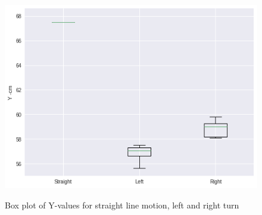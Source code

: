 \documentclass[11pt,a4paper]{article}
\begin{document}
			\begin{figure}[H]
				\centering	
				\includegraphics[width=1.0\linewidth]{boxplot-y}
				\label{fig:box-y}
				\caption{Box plot of Y-values for straight line motion, left and right turn}
			\end{figure}
			
\end{document}
